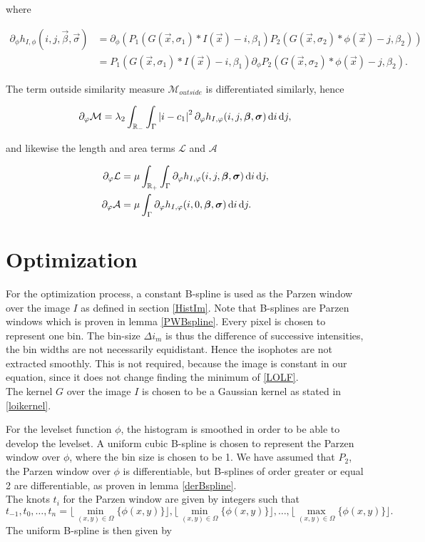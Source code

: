 where

\begin{equation}
  \begin{split}
    \partial_\phi h_{I,\phi}(i,j,\vec{\beta},\vec{\sigma}) &= \partial_\phi \left(P_1(G(\vec{x},\sigma_1)*I(\vec{x})-i,\beta_1)P_2(G(\vec{x},\sigma_2)*\phi(\vec{x})-j,\beta_2)\right)\\ 
    &= P_1(G(\vec{x},\sigma_1)*I(\vec{x})-i,\beta_1)\partial_\phi P_2(G(\vec{x},\sigma_2)*\phi(\vec{x})-j,\beta_2).
  \end{split}
\end{equation}

The term outside similarity measure $\mathcal{M}_{outside}$ is differentiated similarly, hence

\begin{equation}
\partial_\varphi \mathcal{M} = \lambda_2\int_{\mathbb R_-} \int_{\Gamma} \left| {i-c_1} \right|^2 \partial_\varphi h_{I,\varphi}(i,j,\boldsymbol{\beta} ,\boldsymbol{\sigma} )\,{\rm d} i\,{\rm d} j,
\end{equation}

and likewise the length and area terms $\mathcal{L}$ and $\mathcal{A}$

\begin{align}
  \partial_\varphi \mathcal{L} &= \mu \int_{\mathbb R_+} \int_{\Gamma} \partial_\varphi h_{I,\varphi}(i,j,\boldsymbol{\beta} ,\boldsymbol{\sigma} )\,{\rm d} i\,{\rm d} j,\\
  \partial_\varphi \mathcal{A} &= \mu  \int_{\Gamma} \partial_\varphi h_{I,\varphi}(i,0,\boldsymbol{\beta} ,\boldsymbol{\sigma} )\,{\rm d} i\,{\rm d} j.
\end{align}

\section{Optimization}\label{section:OLopt}
For the optimization process, a constant B-spline is used as the Parzen window over the image $I$ as defined in section \ref{HistIm}. Note that B-splines are Parzen windows which is proven in lemma \eqref{PWBspline}. Every pixel is chosen to represent one bin. The bin-size $\Delta i_m$ is thus the difference of successive intensities, the bin widths are not necessarily equidistant. Hence the isophotes are not extracted smoothly. This is not required, because the image is constant in our equation, since it does not change finding the minimum of \eqref{LOLF}.\\
The kernel $G$ over the image $I$ is chosen to be a Gaussian kernel as stated in \eqref{loikernel}. 

For the levelset function $\phi$, the histogram is smoothed in order to be able to develop the levelset. A uniform cubic B-spline is chosen to represent the Parzen window over $\phi$, where the bin size is chosen to be 1. We have assumed that $P_2$, the Parzen window over $\phi$ is differentiable, but B-splines of order greater or equal 2 are differentiable, as proven in lemma \eqref{derBspline}.\\
The knots $t_i$ for the Parzen window are given by integers such that
\[
t_{-1},t_0,\dots,t_n = \lfloor\min_{(x,y)\in\Omega}\{\phi(x,y)\}\rfloor, \lfloor\min_{(x,y)\in\Omega}\{\phi(x,y)\}\rfloor, \dots, \lfloor\max_{(x,y)\in\Omega}\{\phi(x,y)\}\rfloor.
\]
The uniform B-spline is then given by

